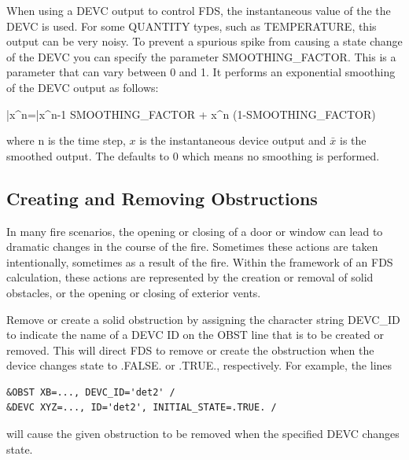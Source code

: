 \documentclass[11pt]{book}
\begin{document}
When using a {\ct DEVC} output to control FDS, the instantaneous value of the the {\ct DEVC} is used.  For some {\ct QUANTITY} types, such as {\ct TEMPERATURE}, this output can be very noisy.  To prevent a spurious spike from causing a state change of the {\ct DEVC} you can specify the parameter {\ct SMOOTHING\_FACTOR}.  This is a parameter that can vary between 0 and 1.  It performs an exponential smoothing of the {\ct DEVC} output as follows:

\be
\bar{x}^n=\bar{x}^{n-1} \; \mbox{\ct SMOOTHING\_FACTOR} + x^n \; (1-\mbox{\ct SMOOTHING\_FACTOR})
\ee

\noindent
where n is the time step, $x$ is the instantaneous device output and $\bar{x}$ is the smoothed output.  The  defaults to 0 which means no smoothing is performed.

\subsection{Creating and Removing Obstructions}
\label{info:create_remove}

In many fire scenarios, the opening or closing of a door or window can lead to dramatic changes in the course of the fire. Sometimes these actions are taken intentionally, sometimes as a result of the fire. Within the framework of an FDS calculation, these actions are represented by the creation or removal of solid obstacles, or the opening or closing of exterior vents.

Remove or create a solid obstruction by assigning the character string {\ct DEVC\_ID} to indicate the name of a {\ct DEVC} {\ct ID} on the {\ct OBST} line that is to be created or removed.  This will direct FDS to remove or create the obstruction when the device changes state to {\ct .FALSE.} or {\ct .TRUE.}, respectively. For example, the lines
\begin{lstlisting}
&OBST XB=..., DEVC_ID='det2' /
&DEVC XYZ=..., ID='det2', INITIAL_STATE=.TRUE. /
\end{lstlisting}
will cause the given obstruction to be removed when the specified {\ct DEVC} changes state.
\end{document}
